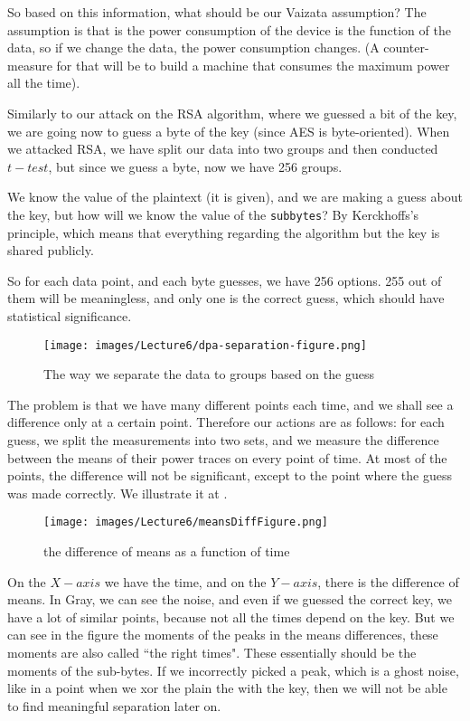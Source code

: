 So based on this information, what should be our Vaizata assumption?
The assumption is that is the power consumption of the device is the function of the data, so if we change the data, the power consumption changes.
(A counter-measure for that will be to build a machine that consumes the maximum power all the time).

Similarly to our attack on the RSA algorithm, where we guessed a bit of the key, we are going now to guess a byte of the key (since AES is byte-oriented). 
When we attacked RSA, we have split our data into two groups and then conducted $t-test$, but since we guess a byte, now we have 256 groups.

We know the value of the plaintext (it is given), and we are making a guess about the key, but how will we know the value of the \texttt{subbytes}? 
By Kerckhoffs's principle, which means that everything regarding the algorithm but the key is shared publicly.

So for each data point, and each byte guesses, we have 256 options. 
255 out of them will be meaningless, and only one is the correct guess, which should have statistical significance.

\begin{figure}[!ht]
    \centering
    \texttt{[image: images/Lecture6/dpa-separation-figure.png]}
    \caption{The way we separate the data to groups based on the guess} \label{fig:dpa-separation-figure}
\end{figure}


The problem is that we have many different points each time, and we shall see a difference only at a certain point. 
Therefore our actions are as follows: for each guess, we split the measurements into two sets, and we measure the difference between the means of their power traces on every point of time. 
At most of the points, the difference will not be significant, except to the point where the guess was made correctly. 
We illustrate it at .

\begin{figure}[!ht]
    \centering
    \texttt{[image: images/Lecture6/meansDiffFigure.png]}
    \caption{the difference of means as a function of time}
    \label{fig:meansDiffFigure}
\end{figure}

On the $X-axis$ we have the time, and on the $Y-axis$, there is the difference of means. 
In Gray, we can see the noise, and even if we guessed the correct key, we have a lot of similar points, because not all the times depend on the key. 
But we can see in the figure the moments of the peaks in the means
differences, these moments are also called ``the right times".
These essentially should be the moments of the sub-bytes. 
If we incorrectly picked a peak, which is a ghost noise, like in a point when we xor the plain the with the key, then we will not be able to find meaningful separation later on.


